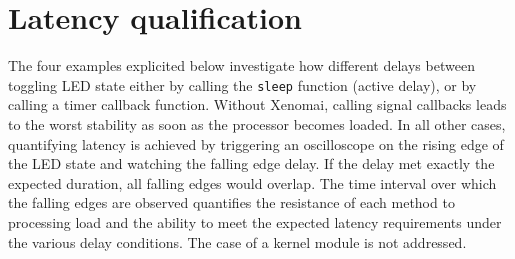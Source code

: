 \documentclass{article}
\begin{document}
{{%
%
%
%
%
%
%
%

\section{Latency qualification}

The four examples explicited below investigate how different delays between toggling
LED state either by calling the {\tt sleep} function (active delay), or by calling a timer
callback function. Without Xenomai, calling signal callbacks leads to the worst stability
as soon as the processor becomes loaded. In all other cases, quantifying latency is achieved
by triggering an oscilloscope on the rising edge of the LED state and watching the falling edge
delay. If the delay met exactly the expected duration, all falling edges would overlap. The
time interval over which the falling edges are observed quantifies the resistance of each method
to processing load and the ability to meet the expected latency requirements under the various
delay conditions. The case of a kernel module is not addressed.

}}
\end{document}
